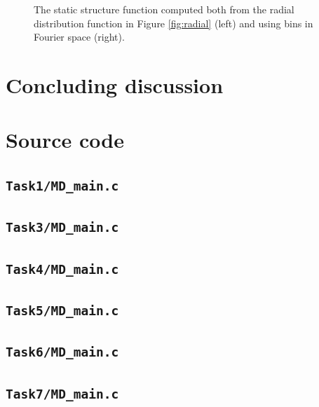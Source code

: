 \begin{figure}[H]
\begin{subfigure}[b]{0.40\textwidth}
    \end{subfigure}
    \caption{The static structure function computed both from the radial distribution function in Figure \ref{fig:radial} (left) and using bins in Fourier space (right).}
    \label{fig:StaticStructure}
\end{figure}


\section*{Concluding discussion}


\vfill


\newpage
\appendix
\section{Source code}

\subsection{\texttt{Task1/MD\_main.c}}


\subsection{\texttt{Task3/MD\_main.c}}


\subsection{\texttt{Task4/MD\_main.c}}


\subsection{\texttt{Task5/MD\_main.c}}


\subsection{\texttt{Task6/MD\_main.c}}


\subsection{\texttt{Task7/MD\_main.c}}


